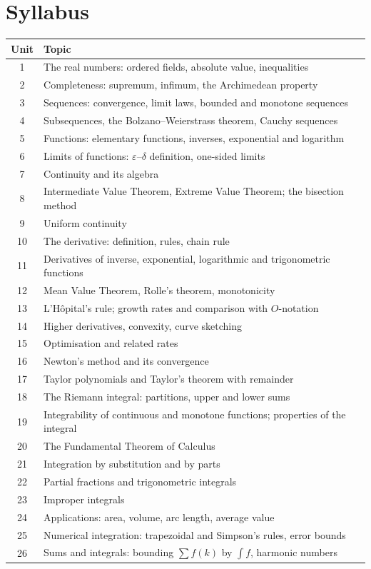 \documentclass[11pt,a4paper]{article}
\begin{document}
\section{Syllabus}
\begin{tabularx}{\textwidth}{c X}
\toprule
\textbf{Unit} & \textbf{Topic} \\
\midrule
1  & The real numbers: ordered fields, absolute value, inequalities \\
2  & Completeness: supremum, infimum, the Archimedean property \\
3  & Sequences: convergence, limit laws, bounded and monotone sequences \\
4  & Subsequences, the Bolzano--Weierstrass theorem, Cauchy sequences \\
5  & Functions: elementary functions, inverses, exponential and logarithm \\
6  & Limits of functions: $\varepsilon$--$\delta$ definition, one-sided limits \\
7  & Continuity and its algebra \\
8  & Intermediate Value Theorem, Extreme Value Theorem; the bisection method \\
9  & Uniform continuity \\
10 & The derivative: definition, rules, chain rule \\
11 & Derivatives of inverse, exponential, logarithmic and trigonometric functions \\
12 & Mean Value Theorem, Rolle's theorem, monotonicity \\
13 & L'H\^opital's rule; growth rates and comparison with $O$-notation \\
14 & Higher derivatives, convexity, curve sketching \\
15 & Optimisation and related rates \\
16 & Newton's method and its convergence \\
17 & Taylor polynomials and Taylor's theorem with remainder \\
18 & The Riemann integral: partitions, upper and lower sums \\
19 & Integrability of continuous and monotone functions; properties of the integral \\
20 & The Fundamental Theorem of Calculus \\
21 & Integration by substitution and by parts \\
22 & Partial fractions and trigonometric integrals \\
23 & Improper integrals \\
24 & Applications: area, volume, arc length, average value \\
25 & Numerical integration: trapezoidal and Simpson's rules, error bounds \\
26 & Sums and integrals: bounding $\sum f(k)$ by $\int f$, harmonic numbers \\
\bottomrule
\end{tabularx}
\end{document}

